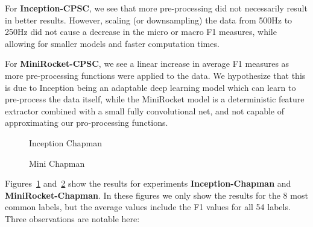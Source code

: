 \documentclass{article}
\begin{document}
For \textbf{Inception-CPSC}, we see that more pre-processing did not necessarily result in better results. However, scaling (or downsampling) the data from 500Hz to 250Hz did not cause a decrease in the micro or macro F1 measures, while allowing for smaller models and faster computation times. 

For \textbf{MiniRocket-CPSC}, we see a linear increase in average F1 measures as more pre-processing functions were applied to the data. We hypothesize that this is due to Inception being an adaptable deep learning model which can learn to pre-process the data itself, while the MiniRocket model is a deterministic feature extractor combined with a small fully convolutional net, and not capable of approximating our pro-processing functions. 


\begin{figure}[!tbp]
  \caption{Inception Chapman}\label{fig:inception_chapman}
\end{figure}


\begin{figure}[!tbp]
  \caption{Mini Chapman}\label{fig:mini_chapman}
\end{figure}


Figures~\ref{fig:inception_chapman} and~\ref{fig:mini_chapman} show the results for experiments \textbf{Inception-Chapman} and \textbf{MiniRocket-Chapman}. In these figures we only show the results for the 8 most common labels, but the average values include the F1 values for all 54 labels. Three observations are notable here: 
\end{document}
